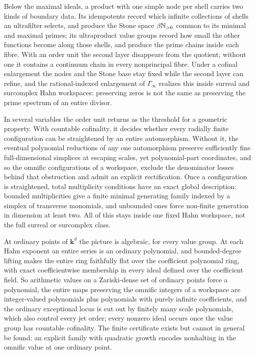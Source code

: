 \documentclass[11pt]{article}
\theoremstyle{plain}
\theoremstyle{plain}
\theoremstyle{plain}
\theoremstyle{definition}
\theoremstyle{definition}
\theoremstyle{definition}
\theoremstyle{definition}
\theoremstyle{remark}
\newcommand{\kk}{\mathbf k}\newcommand{\PP}{\mathbb P}
\begin{document}
Below the maximal ideals, a product with one simple node per shell carries
two kinds of boundary data. Its idempotents record which infinite
collections of shells an ultrafilter selects, and produce the Stone space
$\beta\mathbb N_{>0}$ common to its minimal and maximal primes; its ultraproduct
value groups record how small the other functions become along those
shells, and produce the prime chains inside each fibre. With an order unit
the second layer disappears from the quotient; without one it contains a
continuum chain in every nonprincipal fibre. Under a cofinal enlargement the
nodes and the Stone base stay fixed while the second layer can refine, and
the rational-indexed enlargement of $\Gamma_\infty$ realizes this inside
surreal and surcomplex Hahn workspaces: preserving zeros is not the same as
preserving the prime spectrum of an entire divisor.

In several variables the order unit returns as the threshold for a geometric
property. With countable cofinality, it decides whether every radially finite
configuration can be straightened by an entire automorphism. Without it, the
eventual polynomial reductions of any one automorphism preserve sufficiently
fine full-dimensional simplices at escaping scales, yet polynomial-part
coordinates, and so the omnific configurations of a workspace, exclude the
denominator losses behind that obstruction and admit an explicit
rectification. Once a configuration is straightened, total multiplicity
conditions have an exact global description: bounded multiplicities give a
finite minimal generating family indexed by a simplex of transverse monomials,
and unbounded ones force non-finite generation in dimension at least two. All
of this stays inside one fixed Hahn workspace, not the full surreal or
surcomplex class.

At ordinary points of $\kk^d$ the picture is algebraic, for every value group.
At each Hahn exponent an entire series is an ordinary polynomial, and
bounded-degree lifting makes the entire ring faithfully flat over the
coefficient polynomial ring, with exact coefficientwise membership in every
ideal defined over the coefficient field. So arithmetic values on a
Zariski-dense set of ordinary points force a polynomial, the entire maps
preserving the omnific integers of a workspace are integer-valued polynomials
plus polynomials with purely infinite coefficients, and the ordinary
exceptional locus is cut out by finitely many scale polynomials, which also
control every jet order; every nonzero ideal occurs once the value group has
countable cofinality. The finite certificate exists but cannot in general be
found: an explicit family with quadratic growth encodes nonhalting in the
omnific value at one ordinary point.
\end{document}
